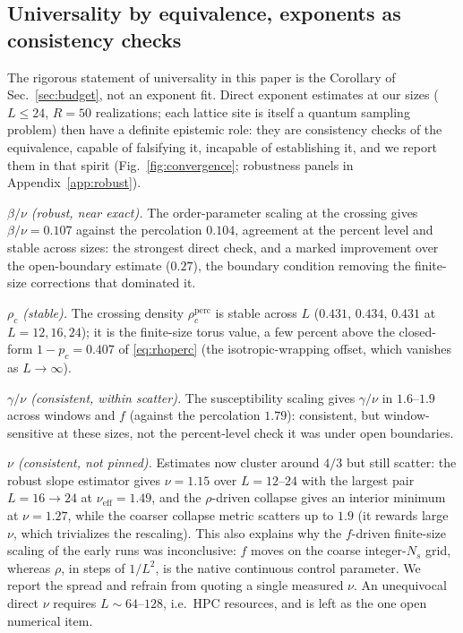 \documentclass[11pt]{article}
\begin{document}
\subsection{Universality by equivalence, exponents as consistency checks}
\label{sec:universality}

The rigorous statement of universality in this paper is the Corollary of
Sec.~\ref{sec:budget}, not an exponent fit. Direct exponent estimates at
our sizes ($L \le 24$, $R = 50$ realizations; each lattice site is itself a
quantum sampling problem) then have a definite epistemic role: they are
consistency checks of the equivalence, capable of falsifying it, incapable
of establishing it, and we report them in that spirit
(Fig.~\ref{fig:convergence}; robustness panels in Appendix~\ref{app:robust}).

\emph{$\beta/\nu$ (robust, near exact).} The order-parameter scaling at the
crossing gives $\beta/\nu = 0.107$ against the percolation $0.104$, agreement
at the percent level and stable across sizes: the strongest direct check, and
a marked improvement over the open-boundary estimate ($0.27$), the boundary
condition removing the finite-size corrections that dominated it.

\emph{$\rho_c$ (stable).} The crossing density $\rho_c^{\mathrm{perc}}$ is
stable across $L$ ($0.431$, $0.434$, $0.431$ at $L = 12,16,24$); it is the
finite-size torus value, a few percent above the closed-form $1-p_c = 0.407$
of \eqref{eq:rhoperc} (the isotropic-wrapping offset, which vanishes as
$L\to\infty$).

\emph{$\gamma/\nu$ (consistent, within scatter).} The susceptibility scaling
gives $\gamma/\nu$ in $1.6$--$1.9$ across windows and $f$ (against the
percolation $1.79$): consistent, but window-sensitive at these sizes, not the
percent-level check it was under open boundaries.

\emph{$\nu$ (consistent, not pinned).} Estimates now cluster around $4/3$ but
still scatter: the robust slope estimator gives $\nu = 1.15$ over $L =
12$--$24$ with the largest pair $L=16\to 24$ at $\nu_{\mathrm{eff}} = 1.49$,
and the $\rho$-driven collapse gives an interior minimum at $\nu = 1.27$,
while the coarser collapse metric scatters up to $1.9$ (it rewards large
$\nu$, which trivializes the rescaling). This also explains why the $f$-driven
finite-size scaling of the early runs was inconclusive: $f$ moves on the
coarse integer-$N_s$ grid, whereas $\rho$, in steps of $1/L^2$, is the native
continuous control parameter. We report the spread and refrain from quoting a
single measured $\nu$. An unequivocal direct $\nu$ requires $L \sim 64$--$128$,
i.e.\ HPC resources, and is left as the one open numerical item.
\end{document}
